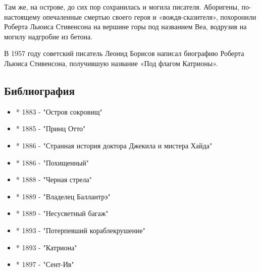 Там же, на острове, до сих пор сохранилась и могила писателя. Аборигены,
по-настоящему опечаленные смертью своего героя и «вождя-сказителя»,
похоронили Роберта Льюиса Стивенсона на вершине горы под названием Веа,
водрузив на могилу надгробие из бетона.

В 1957 году советский писатель Леонид Борисов написал биографию Роберта
Льюиса Стивенсона, получившую название «Под флагом Катрионы».

\subsection{Библиография}

\begin{itemize}
  \item * 1883 - "Остров сокровищ"
  \item * 1885 - "Принц Отто"
  \item * 1886 - "Странная история доктора Джекила и мистера Хайда"
  \item * 1886 - "Похищенный"
  \item * 1888 - "Черная стрела"
  \item * 1889 - "Владелец Баллантрэ"
  \item * 1889 - "Несусветный багаж"
  \item * 1893 - "Потерпевший кораблекрушение"
  \item * 1893 - "Катриона"
  \item * 1897 - "Сент-Ив"
\end{itemize}

